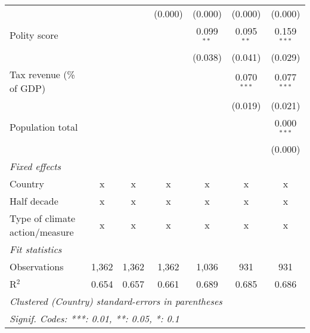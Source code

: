 \begin{tabular}{lcccccc}
                                                                                           &         &                & (0.000)        & (0.000)        & (0.000)        & (0.000)\\   
   Polity score                                                                            &         &                &                & 0.099$^{**}$   & 0.095$^{**}$   & 0.159$^{***}$\\   
                                                                                           &         &                &                & (0.038)        & (0.041)        & (0.029)\\   
   Tax revenue (\% of GDP)                                                                 &         &                &                &                & 0.070$^{***}$  & 0.077$^{***}$\\   
                                                                                           &         &                &                &                & (0.019)        & (0.021)\\   
   Population total                                                                        &         &                &                &                &                & 0.000$^{***}$\\   
                                                                                           &         &                &                &                &                & (0.000)\\   
   \emph{Fixed effects}\\
   Country                                                                                 & x       & x              & x              & x              & x              & x\\  
   Half decade                                                                             & x       & x              & x              & x              & x              & x\\  
   Type of climate action/measure                                                          & x       & x              & x              & x              & x              & x\\  
   \midrule \emph{Fit statistics}\\
   Observations                                                                            & 1,362   & 1,362          & 1,362          & 1,036          & 931            & 931\\  
   R$^2$                                                                                   & 0.654   & 0.657          & 0.661          & 0.689          & 0.685          & 0.686\\  
   \midrule
   \multicolumn{7}{l}{\emph{Clustered (Country) standard-errors in parentheses}}\\
   \multicolumn{7}{l}{\emph{Signif. Codes: ***: 0.01, **: 0.05, *: 0.1}}\\
\end{tabular}
\par\endgroup


